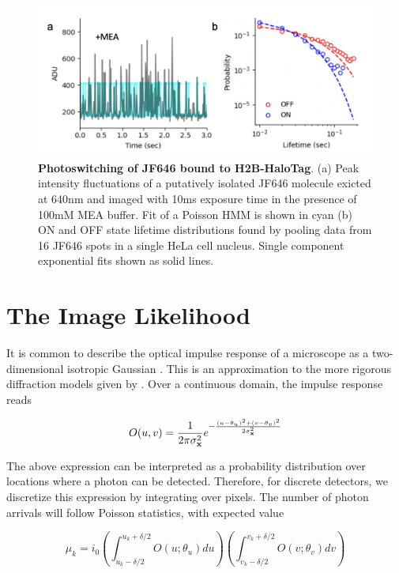 \begin{figure}[t]
\centering
\includegraphics[width=13cm]{media/Lifetime.png}
\caption{\textbf{Photoswitching of JF646 bound to H2B-HaloTag}. (a) Peak intensity fluctuations of a putatively isolated JF646 molecule exicted at 640nm and imaged with 10ms exposure time in the presence of 100mM MEA buffer. Fit of a Poisson HMM is shown in cyan (b) ON and OFF state lifetime distributions found by pooling data from 16 JF646 spots in a single HeLa cell nucleus. Single component exponential fits shown as solid lines.}
\end{figure}


\section{The Image Likelihood}

It is common to describe the optical impulse response of a microscope as a two-dimensional isotropic Gaussian \parencite{Zhang2007}. This is an approximation to the more rigorous diffraction models given by \parencite{Richards1959,Gibson1989}. Over a continuous domain, the impulse response reads

\begin{equation*}
O(u,v) = \frac{1}{2\pi\sigma_{\bold{x}}^{2}}e^{-\frac{(u-\theta_{u})^{2}+(v-\theta_{v})^{2}}{2\sigma_{\bold{x}}^{2}}}
\end{equation*}

The above expression can be interpreted as a probability distribution over locations where a photon can be detected. Therefore, for discrete detectors, we discretize this expression by integrating over pixels. The number of photon arrivals will follow Poisson statistics, with expected value

\begin{equation*}
\mu_{k} = i_{0}\left(\int_{u_{k}-\delta /2}^{u_{k}+\delta /2} O(u; \theta_{u})du \right)\left(\int_{v_{k}-\delta /2}^{v_{k}+\delta /2} O(v;\theta_{v})dv \right)
\end{equation*}

